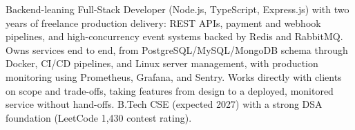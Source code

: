 \documentclass[11pt,a4paper,sans]{moderncv}
\begin{document}
\makecvtitle


\vspace{6pt}
\small{Backend-leaning Full-Stack Developer (Node.js, TypeScript, Express.js) with two years of freelance production delivery: REST APIs, payment and webhook pipelines, and high-concurrency event systems backed by Redis and RabbitMQ. Owns services end to end, from PostgreSQL/MySQL/MongoDB schema through Docker, CI/CD pipelines, and Linux server management, with production monitoring using Prometheus, Grafana, and Sentry. Works directly with clients on scope and trade-offs, taking features from design to a deployed, monitored service without hand-offs. B.Tech CSE (expected 2027) with a strong DSA foundation (LeetCode 1,430 contest rating).}

\end{document}
